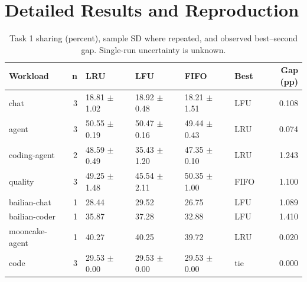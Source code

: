 \documentclass{article}
\begin{document}
\clearpage


\clearpage
\appendix
\section{Detailed Results and Reproduction}
\begin{table}[t]\centering\small
\caption{Task 1 sharing (percent), sample SD where repeated, and observed best--second gap. Single-run uncertainty is unknown.}
\begin{tabular}{lrllllr}\toprule Workload & n & LRU & LFU & FIFO & Best & Gap (pp)\\\midrule
chat & 3 & 18.81 $\pm$ 1.02 & 18.92 $\pm$ 0.48 & 18.21 $\pm$ 1.51 & LFU & 0.108\\
agent & 3 & 50.55 $\pm$ 0.19 & 50.47 $\pm$ 0.16 & 49.44 $\pm$ 0.43 & LRU & 0.074\\
coding-agent & 2 & 48.59 $\pm$ 0.49 & 35.43 $\pm$ 1.20 & 47.35 $\pm$ 0.10 & LRU & 1.243\\
quality & 3 & 49.25 $\pm$ 1.48 & 45.54 $\pm$ 2.11 & 50.35 $\pm$ 1.00 & FIFO & 1.100\\
bailian-chat & 1 & 28.44 & 29.52 & 26.75 & LFU & 1.089\\
bailian-coder & 1 & 35.87 & 37.28 & 32.88 & LFU & 1.410\\
mooncake-agent & 1 & 40.27 & 40.25 & 39.72 & LRU & 0.020\\
code & 3 & 29.53 $\pm$ 0.00 & 29.53 $\pm$ 0.00 & 29.53 $\pm$ 0.00 & tie & 0.000\\
\bottomrule\end{tabular}\end{table}
\end{document}
